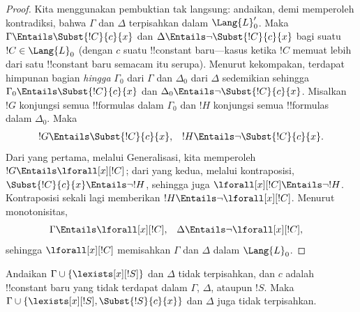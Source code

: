 \documentclass[../../../include/open-logic-section]{subfiles}
\begin{document}
\begin{proof}
Kita menggunakan pembuktian tak langsung: andaikan, demi memperoleh
kontradiksi, bahwa $\Gamma$ dan $\Delta$ terpisahkan dalam $\Lang{L}'_0$.
Maka $\Gamma \Entails \Subst{!C}{c}{x}$ dan $\Delta \Entails \lnot
\Subst{!C}{c}{x}$ bagi suatu $!C \in \Lang{L}_0$ (dengan $c$ suatu
!!{constant} baru---kasus ketika $!C$ memuat lebih dari satu !!{constant}
baru semacam itu serupa). Menurut kekompakan, terdapat himpunan bagian
\emph{hingga} $\Gamma_0$ dari $\Gamma$ dan $\Delta_0$ dari $\Delta$
sedemikian sehingga $\Gamma_0 \Entails \Subst{!C}{c}{x}$ dan
$\Delta_0 \Entails \lnot \Subst{!C}{c}{x}$. Misalkan $!G$ konjungsi
semua !!{formula}s dalam $\Gamma_0$ dan $!H$ konjungsi semua !!{formula}s
dalam $\Delta_0$. Maka
\begin{align*}
  !G & \Entails \Subst{!C}{c}{x}, & !H  \Entails \lnot \Subst{!C}{c}{x}.
\end{align*}
Dari yang pertama, melalui Generalisasi, kita memperoleh $!G \Entails
\lforall[x][!C]$; dari yang kedua, melalui kontraposisi,
$\Subst{!C}{c}{x} \Entails \lnot !H$, sehingga juga $\lforall[x][!C]
\Entails \lnot !H$. Kontraposisi sekali lagi memberikan $!H \Entails
\lnot \lforall[x][!C]$. Menurut monotonisitas,
\begin{align*}
  \Gamma &\Entails \lforall[x][!C], &
  \Delta & \Entails \lnot \lforall[x][!C],
\end{align*}
sehingga $\lforall[x][!C]$ memisahkan $\Gamma$ dan $\Delta$ dalam
$\Lang{L}_0$.
\end{proof}

\begin{lem}
Andaikan $\Gamma \cup \{ \lexists[x][!S] \}$ dan $\Delta$ tidak
terpisahkan, dan $c$ adalah !!{constant} baru yang tidak terdapat dalam
$\Gamma$, $\Delta$, ataupun $!S$. Maka $\Gamma \cup \{
\lexists[x][!S], \Subst{!S}{c}{x} \}$ dan $\Delta$ juga tidak
terpisahkan.
\end{lem}
\end{document}
